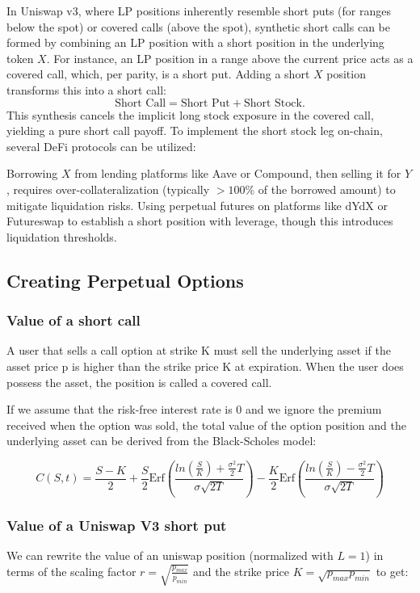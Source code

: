 \documentclass{article}
\begin{document}
In Uniswap v3, where LP positions inherently resemble short puts (for ranges below the spot) or covered calls (above the spot), synthetic short calls can be formed by combining an LP position with a short position in the underlying token $X$. For instance, an LP position in a range above the current price acts as a covered call, which, per parity, is a short put. Adding a short $X$ position transforms this into a short call:
$$\text{Short Call} = \text{Short Put} + \text{Short Stock}.$$
This synthesis cancels the implicit long stock exposure in the covered call, yielding a pure short call payoff.
To implement the short stock leg on-chain, several DeFi protocols can be utilized:

Borrowing $X$ from lending platforms like Aave or Compound, then selling it for $Y$, requires over-collateralization (typically $>100\%$ of the borrowed amount) to mitigate liquidation risks.
Using perpetual futures on platforms like dYdX or Futureswap to establish a short position with leverage, though this introduces liquidation thresholds.

\subsection{Creating Perpetual Options}

\subsubsection{Value of a short call}
A user that sells a call option at strike K must sell the underlying asset if the asset price p is higher than the strike price K at expiration. When the user does possess the asset, the position is called a covered call.

If we assume that the risk-free interest rate is 0 and we ignore the premium received when the option was sold, the total value of the option position and the underlying asset can be derived from the Black-Scholes model:

\begin{equation}
    C(S,t)=\frac{S-K}{2} + \frac{S}{2}\text{Erf}\left( 
    \frac{ln(\frac{S}{K} )+\frac{\sigma^2}{2}T}
    {\sigma \sqrt{2T}}\right)
    - \frac{K}{2}\text{Erf} \left(
    \frac{ln(\frac{S}{K} )-\frac{\sigma^2}{2}T}
    {\sigma \sqrt{2T}}
    \right)
\end{equation}


\subsubsection{Value of a Uniswap V3 short put}
We can rewrite the value of an uniswap position (normalized with $L=1$) in terms of the scaling factor $r=\sqrt{\frac{p_{max}}{p_{min}}}$ and the strike price $K=\sqrt{p_{max}p_{min}}$ to get:
\end{document}
